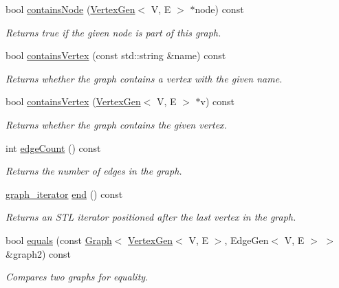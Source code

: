 \begin{DoxyCompactItemize}
bool \mbox{\hyperlink{classGraph_a4f540ebc07c4e46a0bb7fee76a93386c}{contains\+Node}} (\mbox{\hyperlink{classVertexGen}{Vertex\+Gen}}$<$ V, E $>$ $\ast$node) const
\begin{DoxyCompactList}\small\item\em Returns true if the given node is part of this graph. \end{DoxyCompactList}\item 
bool \mbox{\hyperlink{classBasicGraphGen_ab6062ac98f3491a525e0809c5b03b7cf}{contains\+Vertex}} (const std\+::string \&name) const
\begin{DoxyCompactList}\small\item\em Returns whether the graph contains a vertex with the given name. \end{DoxyCompactList}\item 
bool \mbox{\hyperlink{classBasicGraphGen_a37d4f31bc5bb6397fdb0bf966b54ca3f}{contains\+Vertex}} (\mbox{\hyperlink{classVertexGen}{Vertex\+Gen}}$<$ V, E $>$ $\ast$v) const
\begin{DoxyCompactList}\small\item\em Returns whether the graph contains the given vertex. \end{DoxyCompactList}\item 
int \mbox{\hyperlink{classBasicGraphGen_aa1f43093f29e66e171d5f572a658ae0c}{edge\+Count}} () const
\begin{DoxyCompactList}\small\item\em Returns the number of edges in the graph. \end{DoxyCompactList}\item 
\mbox{\hyperlink{classGraph_a695969c31e87f9e8319d74e5ca39024b}{graph\+\_\+iterator}} \mbox{\hyperlink{classGraph_afcdf62cae5d7e50644957d66f886742d}{end}} () const
\begin{DoxyCompactList}\small\item\em Returns an S\+TL iterator positioned after the last vertex in the graph. \end{DoxyCompactList}\item 
bool \mbox{\hyperlink{classGraph_a6bec43eb3dfdf3d23eb328b406edf44a}{equals}} (const \mbox{\hyperlink{classGraph}{Graph}}$<$ \mbox{\hyperlink{classVertexGen}{Vertex\+Gen}}$<$ V, E $>$, Edge\+Gen$<$ V, E $>$ $>$ \&graph2) const
\begin{DoxyCompactList}\small\item\em Compares two graphs for equality. \end{DoxyCompactList}\item 

\end{DoxyCompactItemize}
